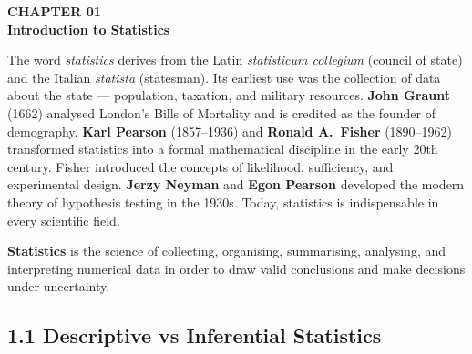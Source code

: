\documentclass[12pt]{article}
\begin{document}
\newpage
\begin{tcolorbox}[enhanced,arc=0pt,boxrule=0pt,colback=primary,colframe=primary,
  left=20pt,right=20pt,top=20pt,bottom=16pt,borderline south={5pt}{0pt}{accent}]
\end{tcolorbox}
\vspace{6pt}\tableofcontents\newpage

\begin{tcolorbox}[enhanced,arc=0pt,boxrule=0pt,colback=primary,colframe=primary,
  left=16pt,right=16pt,top=14pt,bottom=10pt,borderline south={4pt}{0pt}{accent}]
  {\color{accent!70}\small\bfseries CHAPTER 01}\\[4pt]
  {\LARGE\bfseries\color{white}Introduction to Statistics}
\end{tcolorbox}
\vspace{10pt}

\begin{histbox}
The word \textit{statistics} derives from the Latin \textit{statisticum collegium} (council of state) and the Italian \textit{statista} (statesman). Its earliest use was the collection of data about the state — population, taxation, and military resources. \textbf{John Graunt} (1662) analysed London's Bills of Mortality and is credited as the founder of demography. \textbf{Karl Pearson} (1857--1936) and \textbf{Ronald A.\ Fisher} (1890--1962) transformed statistics into a formal mathematical discipline in the early 20th century. Fisher introduced the concepts of likelihood, sufficiency, and experimental design. \textbf{Jerzy Neyman} and \textbf{Egon Pearson} developed the modern theory of hypothesis testing in the 1930s. Today, statistics is indispensable in every scientific field.
\end{histbox}

\bigskip

\begin{defbox}[Statistics]
\textbf{Statistics} is the science of collecting, organising, summarising, analysing, and interpreting numerical data in order to draw valid conclusions and make decisions under uncertainty.
\end{defbox}

\subsection{1.1 Descriptive vs Inferential Statistics}
\end{document}

